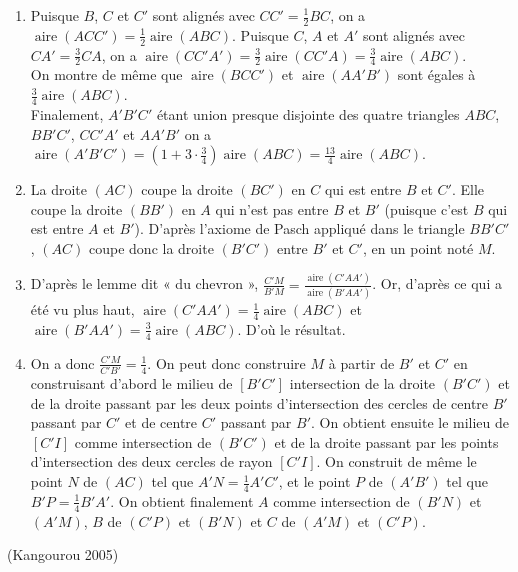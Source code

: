 \documentclass[a4paper,12pt,reqno]{amsart}
\DeclareMathOperator{\A}{aire}
\begin{document}
\begin{solution}
  \begin{enumerate}
    \item Puisque $B$, $C$ et $C'$ sont alignés avec $CC'=\frac{1}{2} BC$, on a $\A(ACC')=\frac{1}{2}\A(ABC)$. Puisque $C$, $A$ et $A'$ sont alignés avec $CA'=\frac{3}{2}CA$, on a $\A(CC'A')=\frac{3}{2}\A(CC'A)=\frac{3}{4}\A(ABC)$.\\
    On montre de même que $\A(BCC')$ et $\A(AA'B')$ sont égales à $\frac{3}{4}\A(ABC)$.\\
    Finalement, $A'B'C'$ étant union presque disjointe des quatre triangles $ABC$, $BB'C'$, $CC'A'$ et $AA'B'$ on a $\A(A'B'C')=(1+3 \cdot \frac{3}{4})\A(ABC)=\frac{13}{4}\A(ABC)$.
    \item La droite $(AC)$ coupe la droite $(BC')$ en $C$ qui est entre $B$ et $C'$. Elle coupe la droite $(BB')$ en $A$ qui n'est pas entre $B$ et $B'$ (puisque c'est $B$ qui est entre $A$ et $B'$). D'après l'axiome de Pasch appliqué dans le triangle $BB'C'$, $(AC)$ coupe donc la droite $(B'C')$ entre $B'$ et $C'$, en un point noté $M$.
    \item D'après le lemme dit « du chevron », $\frac{C'M}{B'M}=\frac{\A(C'AA')}{\A(B'AA')}$. Or, d'après ce qui a été vu plus haut, $\A(C'AA')= \frac{1}{4}\A(ABC)$ et $\A(B'AA')=\frac{3}{4}\A(ABC)$. D'où le résultat.
    \item On a donc $\frac{C'M}{C'B'}=\frac{1}{4}$. On peut donc construire $M$ à partir de $B'$ et $C'$ en construisant d'abord le milieu de $[B'C']$ intersection de la droite $(B'C')$ et de la droite passant par les deux points d'intersection des cercles de centre $B'$ passant par $C'$ et de centre $C'$ passant par $B'$. On obtient ensuite  le milieu de $[C'I]$ comme intersection de $(B'C')$ et de la droite passant par les points d'intersection des deux cercles de rayon $[C'I]$. On construit de même le point $N$ de $(AC)$ tel que $A'N=\frac{1}{4} A'C'$, et le point $P$ de $(A'B')$ tel que $B'P=\frac{1}{4}B'A'$. On obtient finalement $A$ comme intersection de $(B'N)$ et $(A'M)$, $B$ de $(C'P)$ et $(B'N)$ et $C$ de $(A'M)$ et $(C'P)$.
  \end{enumerate}
\end{solution}

\sisujet{\bigskip}
\begin{exo}[.7] (Kangourou 2005)

\end{exo}
\end{document}
